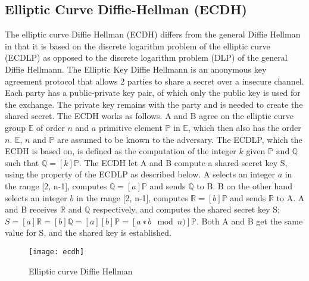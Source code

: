 \subsection{Elliptic Curve Diffie-Hellman (ECDH)}
The elliptic curve Diffie Hellman (ECDH) differs from the general Diffie Hellman in that it is based on the discrete logarithm problem of the elliptic curve (ECDLP) as opposed to the discrete logarithm problem (DLP) of the general Diffie Hellmann. The Elliptic Key Diffie Hellmann is an anonymous key agreement protocol that allows 2 parties to share a secret over a insecure channel. Each party has a public-private key pair, of which only the public key is used for the exchange. The private key remains with the party and is needed to create the shared secret.
\newline
The ECDH works as follows. A and B agree on the elliptic curve group \(\mathbb{E}\) of order \(n\) and \(a\) primitive element \(\mathbb{P}\) in \(\mathbb{E}\), which then also has the order \(n\). \(\mathbb{E} \text{, } n \text{ and } \mathbb{P}\) are assumed to be known to the adversary. The ECDLP, which the ECDH is based on, is defined as the computation of the integer \(k\) given \(\mathbb{P} \text{ and } \mathbb{Q}\) such that \(\mathbb{Q} = [k]\mathbb{P}\). The ECDH
let A and B compute a shared secret key S, using the property of the ECDLP as described below. A selects an integer \(a\) in the range [2, n-1], computes
\(\mathbb{Q} = [a]\mathbb{P}\) and sends \(\mathbb{Q}\) to B. B on the other hand selects an integer \(b\) in the range [2, n-1], computes \(\mathbb{R} = [b]\mathbb{P}\) and sends \(\mathbb{R}\) to A. A and B receives \(\mathbb{R} \text{ and } \mathbb{Q}\) respectively, and computes the shared secret key 
S; \(S = [a]\mathbb{R} = [b]\mathbb{Q} = [a][b]\mathbb{P} = [a ∗ b \mod{n})]\mathbb{P}\). Both A and B get the same value for S, and the shared key is established.\cite{ECDH}
\newline
\begin{center}
\begin{figure}[!htb]
    \centering
    \texttt{[image: ecdh]}
    \caption{Elliptic curve Diffie Hellman}
    \label{fig:ecdh}
\end{figure}
\end{center}
\newpage